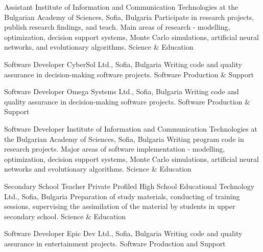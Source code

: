 \documentclass[english,a4paper]{europasscv}
\begin{document}
  \begin{europasscv}

  \ecvpersonalinfo


  
   {Assistant}
  \ecvitem {} {Institute of Information and Communication Technologies at the Bulgarian Academy of Sciences, Sofia, Bulgaria}
  \ecvitem {} {Participate in research projects, publish research findings, and teach. Main areas of research - modelling, optimization, decision support systems, Monte Carlo simulations, artificial neural networks, and evolutionary algorithms.}
  \ecvitem {} { \quad Science \& Education}
  
   {Software Developer}
  \ecvitem {} {CyberSol Ltd., Sofia, Bulgaria}
  \ecvitem {} {Writing code and quality assurance in decision-making software projects.}
  \ecvitem {} { \quad Software Production \& Support}
  
   {Software Developer}
  \ecvitem {} {Omega Systems Ltd., Sofia, Bulgaria}
  \ecvitem {} {Writing code and quality assurance in decision-making software projects.}
  \ecvitem {} { \quad Software Production \& Support}
  
   {Software Developer}
  \ecvitem {} {Institute of Information and Communication Technologies at the Bulgarian Academy of Sciences, Sofia, Bulgaria}
  \ecvitem {} {Writing program code in research projects. Major areas of software implementation - modelling, optimization, decision support systems, Monte Carlo simulations, artificial neural networks and evolutionary algorithms.}
  \ecvitem {} { \quad Science \& Education}
  
   {Secondary School Teacher}
  \ecvitem {} {Private Profiled High School Educational Technology Ltd., Sofia, Bulgaria}
  \ecvitem {} {Preparation of study materials, conducting of training sessions, supervising the assimilation of the material by students in upper secondary school.}
  \ecvitem {} { \quad Science \& Education}
  
   {Software Developer}
  \ecvitem {} {Epic Dev Ltd., Sofia, Bulgaria}
  \ecvitem {} {Writing code and quality assurance in entertainment projects.}
  \ecvitem {} { \quad Software Production and Support}
  

\end{europasscv}
\end{document}
